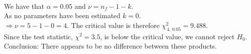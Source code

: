 \documentclass[12pt]{article}
\begin{document}
{\begin{minipage}[t]{0.98\textwidth}
\begin{minipage}[t]{0.47\textwidth}
\begin{enumerate}
\begin{align*}
\end{align*}
We have that $\alpha = 0.05$ and $\nu = n_f - 1 - k$.\\[0.2cm]
As no parameters have been estimated $k=0$.\\[0.2cm]
$\Rightarrow \nu = 5 - 1 - 0 = 4$.
The critical value is therefore $\chi^2_{\,4,\,0.05} = 9.488$.\\[0.8cm]
Since the test statistic, $\chi^2 = 3.5$, is below the critical value, we cannot reject $H_0$.\\[0.6cm]
Conclusion: There appears to be no difference between these products.
\end{enumerate}
\end{minipage}
\end{minipage}}\vspace{0.03\textwidth}
\end{document}
